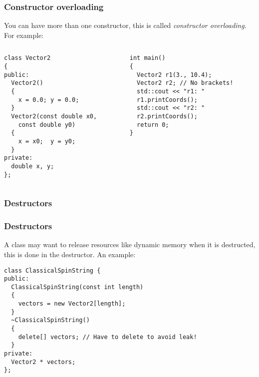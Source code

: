 \documentclass{beamer}
\begin{document}
\begin{frame}[fragile]
  \frametitle{Constructor overloading}
  
  You can have more than one constructor, this is called \textit{constructor overloading}.  For example:
  \begin{columns}[t]
    \begin{column}[T]{0.5\linewidth}
      \begin{lstlisting}[aboveskip=0pt,belowskip=0pt]
class Vector2
{
public:
  Vector2()
  {
    x = 0.0; y = 0.0;
  }
  Vector2(const double x0,
    const double y0)
  {
    x = x0;  y = y0;
  }
private:
  double x, y;
};  
  \end{lstlisting}
    \end{column}
    \begin{column}[T]{0.5\linewidth}
      \begin{lstlisting}[aboveskip=0pt,belowskip=0pt]
int main()
{
  Vector2 r1(3., 10.4);
  Vector2 r2; // No brackets!
  std::cout << "r1: "
  r1.printCoords();
  std::cout << "r2: "
  r2.printCoords();
  return 0;
}
      \end{lstlisting}
    \end{column}
  \end{columns}  

\end{frame}


\subsubsection{Destructors}

\begin{frame}[fragile]
  \frametitle{Destructors}
  
	A class may want to release resources like dynamic memory when it is destructed, this is done in the destructor.
  \pause
  An example:
  \begin{lstlisting}[basicstyle=\ttfamily\fontsize{8}{9}\selectfont{},belowskip=0pt]
class ClassicalSpinString {
public:
  ClassicalSpinString(const int length)
  {
    vectors = new Vector2[length];
  }
  ~ClassicalSpinString()
  {
    delete[] vectors; // Have to delete to avoid leak!
  }
private:
  Vector2 * vectors;
};  
  \end{lstlisting}
  
  
\end{frame}
\end{document}
